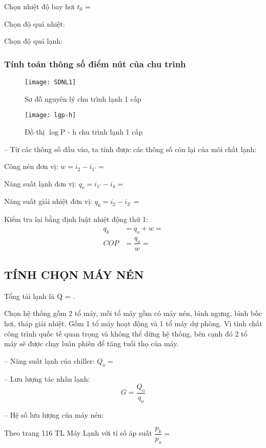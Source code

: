Chọn nhiệt độ bay hơi $t_{0}$ = 

Chọn độ quá nhiệt: 

Chọn độ quá lạnh: 

\subsubsection{Tính toán thông số điểm nút của chu trình}
\begin{figure}[H]
	\centering
	\texttt{[image: SDNL1]}
	\caption{Sơ đồ nguyên lý chu trình lạnh 1 cấp}
	\texttt{[image: lgp-h]}
	\caption{Đồ thị $\log$P - h chu trình lạnh 1 cấp}
\end{figure}

-- Từ các thông số đầu vào, ta tính được các thông số còn lại của môi chất lạnh:
%
%

Công nén đơn vị: $w = i_{2} - i_{1'} = $

Năng suất lạnh đơn vị: $q_{o} = i_{1'} - i_{4} = $

Năng suất giải nhiệt đơn vị: $q_{k} = i_{2} - i_{3'} = $

Kiểm tra lại bằng định luật nhiệt động thứ 1:
\begin{equation*}
	\begin{split}
		q_{k} &= q_{o} + w = \\
		COP &= \dfrac{q_{o}}{w} = 
	\end{split}
\end{equation*}

\subsection{TÍNH CHỌN MÁY NÉN}
Tổng tải lạnh là Q = .

Chọn hệ thống gồm 2 tổ máy, mỗi tổ máy gồm có máy nén, bình ngưng, bình bốc hơi, tháp giải nhiệt. Gồm 1 tổ máy hoạt động và 1 tổ máy dự phòng. Vì tính chất công trình quốc tế quan trọng và không thể dừng hệ thống, bên cạnh đó 2 tổ máy sẽ được chạy luân phiên để tăng tuổi thọ của máy.

-- Năng suất lạnh của chiller: $Q_{o} = $

-- Lưu lượng tác nhân lạnh: 
\begin{equation*}
	G = \dfrac{Q_{o}}{q_{o}}
\end{equation*}

-- Hệ số lưu lượng của máy nén: 

Theo trang 116 TL Máy Lạnh với tỉ số áp suất $\dfrac{p_{k}}{p_{o}} = $
	
